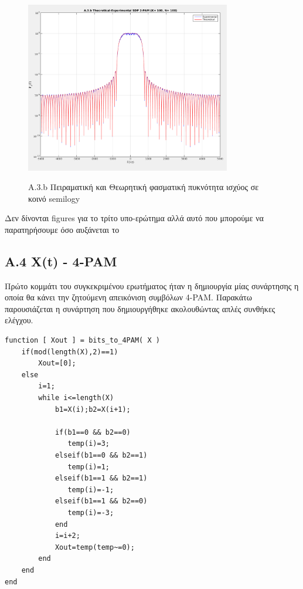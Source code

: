 \documentclass[11pt]{article}
\begin{document}
      \begin{figure}[H]
        \centering
        \includegraphics[scale=0.5, width=0.8\textwidth]{photos/A.3.b - SDP 2-PAM_K-100_N-100.png} \\
        \caption{A.3.b Πειραματική και Θεωρητική φασματική πυκνότητα ισχύος σε κοινό semilogy}
    \end{figure}
    
    \par \noindent
    Δεν δίνονται figures για το τρίτο υπο-ερώτημα αλλά αυτό που μπορούμε να παρατηρήσουμε όσο αυξάνεται το 
    
    \subsection*{A.4 X(t) - 4-PAM }
    Πρώτο κομμάτι του συγκεκριμένου ερωτήματος ήταν η δημιουργία μίας συνάρτησης η οποία θα κάνει την ζητούμενη απεικόνιση συμβόλων 4-PAM.
    Παρακάτω παρουσιάζεται η συνάρτηση που δημιουργήθηκε ακολουθώντας απλές συνθήκες ελέγχου.
    
    \begin{lstlisting}[caption = {\emph{\texttt{bits\_to\_4PAM.m}}}]
function [ Xout ] = bits_to_4PAM( X )
    if(mod(length(X),2)==1)
        Xout=[0];
    else
        i=1;
        while i<=length(X)
            b1=X(i);b2=X(i+1);
 
            if(b1==0 && b2==0)
               temp(i)=3; 
            elseif(b1==0 && b2==1)
               temp(i)=1;
            elseif(b1==1 && b2==1)
               temp(i)=-1; 
            elseif(b1==1 && b2==0)
               temp(i)=-3;      
            end
            i=i+2;
            Xout=temp(temp~=0);
        end
    end
end
    \end{lstlisting}
    
\end{document}
